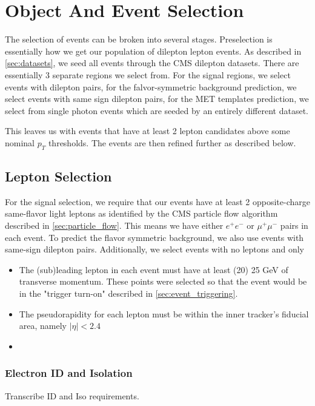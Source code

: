 \section{Object And Event Selection}

  The selection of events can be broken into several stages. Preselection is essentially how we get our population of dilepton lepton events. As described in \ref{sec:datasets}, we seed all events through the CMS dilepton datasets. There are essentially 3 separate regions we select from. For the signal regions, we select events with dilepton pairs, for the falvor-symmetric background prediction, we select events with same sign dilepton pairs, for the MET templates prediction, we select from single photon events which are seeded by an entirely different dataset.

  This leaves us with events that have at least 2 lepton candidates above some nominal $p_T$ thresholds. The events are then refined further as described below.
  
  \subsection{Lepton Selection}
    For the signal selection, we require that our events have at least 2 opposite-charge same-flavor light leptons as identified by the CMS particle flow algorithm described in \ref{sec:particle_flow}. This means we have either $e^+e^-$ or $\mu^+ \mu^-$ pairs in each event. To predict the flavor symmetric background, we also use events with same-sign dilepton pairs. Additionally, we select events with no leptons and only

    \begin{itemize}
      \item The (sub)leading lepton in each event must have at least (20) 25 GeV of transverse momentum. These points were selected so that the event would be in the "trigger turn-on" described in \ref{sec:event_triggering}.
      \item The pseudorapidity for each lepton must be within the inner tracker's fiducial area, namely $\left|\eta\right| < 2.4$
      \item 
    \end{itemize}

    \subsubsection{Electron ID and Isolation}
    Transcribe ID and Iso requirements.

